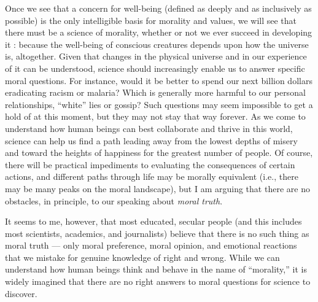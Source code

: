 \documentclass[a4paper,14pt]{extarticle}
\begin{document}
Once we see that a concern for well-being (defined as deeply and as inclusively as possible) is the only intelligible basis for morality and values, we will see that there must be a science of morality, whether or not we ever succeed in developing it :
because the well-being of conscious creatures depends upon how the universe is, altogether.
Given that changes in the physical universe and in our experience of it can be understood, science should increasingly enable us to answer specific moral questions.
For instance, would it be better to spend our next billion dollars eradicating racism or malaria?
Which is generally more harmful to our personal relationships, ``white'' lies or gossip?
Such questions may seem impossible to get a hold of at this moment, but they may not stay that way forever.
As we come to understand how human beings can best collaborate and thrive in this world, science can help us find a path leading away from the lowest depths of misery and toward the heights of happiness for the greatest number of people.
Of course, there will be practical impediments to evaluating the consequences of certain actions, and different paths through life may be morally equivalent (i.e., there may be many peaks on the moral landscape), but I am arguing that there are no obstacles, in principle, to our speaking about \textit{moral truth}.

It seems to me, however, that most educated, secular people (and this includes most scientists, academics, and journalists) believe that there is no such thing as moral truth --- only moral preference, moral opinion, and emotional reactions that we mistake for genuine knowledge of right and wrong.
While we can understand how human beings think and behave in the name of ``morality,'' it is widely imagined that there are no right answers to moral questions for science to discover.
\end{document}
